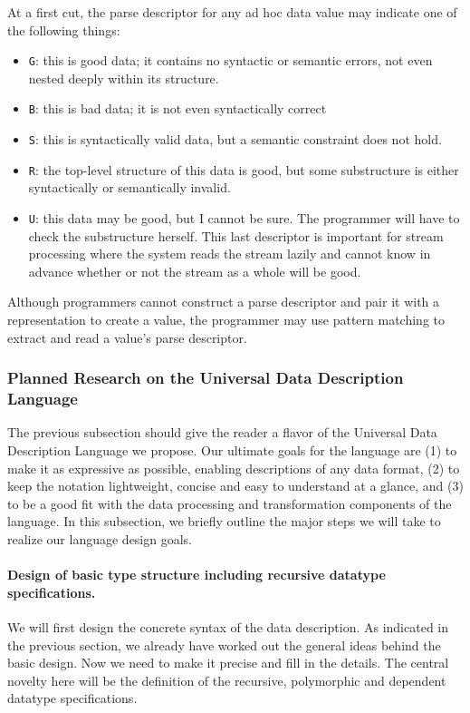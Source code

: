 \documentclass[11pt]{article}
\begin{document}
At a first cut, the parse descriptor for any ad hoc data
value may indicate one of the following things:
\begin{itemize}
\item {\tt G}: this is good data; it contains no syntactic or 
semantic errors, not even nested deeply within its structure.
\item {\tt B}: this is bad data; it is not even syntactically correct
\item {\tt S}: this is syntactically valid data, but a semantic constraint 
does not hold.
\item {\tt R}: the top-level structure of this data is good, but some
substructure is either syntactically or semantically invalid.
\item {\tt U}: this data may be good, but I cannot be sure.  The programmer will
have to check the substructure herself.  This last descriptor
is important for stream processing where the system reads the
stream lazily and cannot know in advance whether or not the stream
as a whole will be good.
\end{itemize}

Although programmers cannot construct a parse descriptor and pair it with a
representation to create a value, the programmer may use pattern matching
to extract and read a value's parse descriptor.  

\subsubsection{Planned Research on the Universal Data Description Language}

The previous subsection should give the reader a flavor of the
Universal Data Description Language we propose.
Our ultimate goals for the language are (1) to make it
as expressive as possible, enabling descriptions of
any data format, (2) to keep the notation lightweight, 
concise and easy to understand at a glance, and (3)
to be a good fit with the data processing and
transformation components of the \datatype{} language.
In this subsection, we briefly outline the major steps
we will take to realize our language design goals.

\paragraph*{Design of basic type structure including recursive datatype specifications.}
We will first design the concrete syntax of the data description.
As indicated in the previous section, we already have worked
out the general ideas behind the basic design.  Now we need to make 
it precise and fill in the details.  The central novelty
here will be the definition of the recursive, polymorphic
and dependent datatype specifications.
\end{document}
